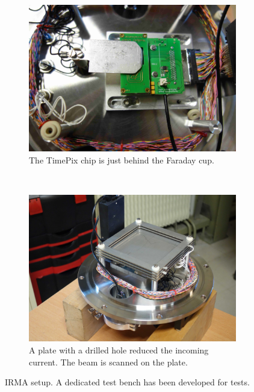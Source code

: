 \begin{figure}[!ht]
	\begin{subfigure}[t]{0.5\textwidth}
		\includegraphics[width=\textwidth]{04_IPHI_Test/figures/fig000_IRMA_setup01}
		\caption{The TimePix chip is just behind the Faraday cup.}
		\label{}
	\end{subfigure}
	~
	\begin{subfigure}[t]{0.5\textwidth}
		\includegraphics[width=\textwidth]{04_IPHI_Test/figures/fig000_IRMA_setup02}
		\caption{A plate with a drilled hole reduced the incoming current. The beam is scanned on the plate.}
		\label{}
	\end{subfigure}
	\caption[IRMA setup]{IRMA setup. A dedicated test bench has been developed for tests.}
	\label{chap4:IRMA_setup}
\end{figure}
